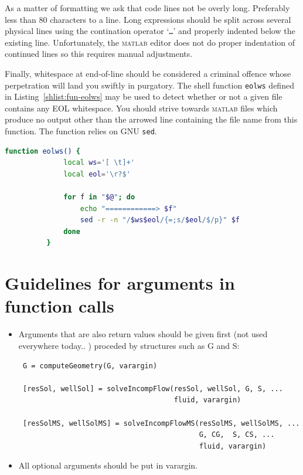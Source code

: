 \documentclass[11pt,twoside,UKenglish]{scrartcl}
\newcommand{\matlab}  {\textsc{matlab}}
\newcommand{\MATLABKeyword}[1]{\texttt{#1}}
\newcommand{\FunctionName} [1]{\texttt{#1}}
\begin{document}
As a matter of formatting we ask that code lines not be overly long.
Preferably less than $80$ characters to a line.  Long expressions should
be split across several physical lines using the contination operator
`\MATLABKeyword{\ldots}' and properly indented below the existing line.
Unfortunately, the {\matlab} editor does not do proper indentation of
continued lines so this requires manual adjustments.

Finally, whitespace at end-of-line should be considered a criminal
offence whose perpetration will land you swiftly in purgatory.  The
shell function \FunctionName{eolws} defined in
Listing~\ref{shlist:fun-eolws} may be used to detect whether or not a
given file contains any EOL whitespace.  You should strive towards
{\matlab} files which produce no output other than the arrowed line
containing the file name from this function.  The function relies on GNU
\FunctionName{sed}.
\begin{lstlisting}[language=bash,float=htbp,
                   caption={\textsc{bash} function to detect end-of-line
                   whitespace.},
                   label={shlist:fun-eolws}]
          function eolws() {
              local ws='[ \t]+'
              local eol='\r?$'

              for f in "$@"; do
                  echo "============> $f"
                  sed -r -n "/$ws$eol/{=;s/$eol/$/p}" $f
              done
          }
\end{lstlisting}


\section{Guidelines for arguments in function calls}

\begin{itemize}

\item
Arguments that are also return values should be given first (not used
everywhere today.. ) proceded by structures such as G and S:

\begin{verbatim}
 G = computeGeometry(G, varargin)

 [resSol, wellSol] = solveIncompFlow(resSol, wellSol, G, S, ...
                                     fluid, varargin)

 [resSolMS, wellSolMS] = solveIncompFlowMS(resSolMS, wellSolMS, ...
                                           G, CG,  S, CS, ...
                                           fluid, varargin)

\end{verbatim}

\item
All optional arguments should be put in varargin.
\end{itemize}
\end{document}
